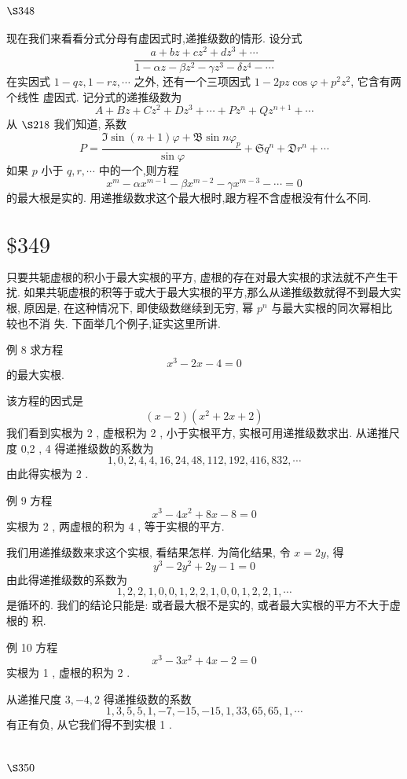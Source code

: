 \section{$\S 348$}

现在我们来看看分式分母有虚因式时,递推级数的情形. 设分式
\[
\frac{a+b z+c z^{2}+d z^{3}+\cdots}{1-\alpha z-\beta z^{2}-\gamma z^{3}-\delta z^{4}-\cdots}
\]
在实因式 $1-q z, 1-r z, \cdots$ 之外, 还有一个三项因式 $1-2 p z \cos \varphi+p^{2} z^{2}$, 它含有两个线性 虚因式. 记分式的递推级数为
\[
A+B z+C z^{2}+D z^{3}+\cdots+P z^{n}+Q z^{n+1}+\cdots
\]
从 $\S 218$ 我们知道, 系数
\[
P=\frac{\mathfrak{I} \sin (n+1) \varphi+\mathfrak{B} \sin n \varphi_{p}}{\sin \varphi}+\mathfrak{S} q^{n}+\mathfrak{D} r^{n}+\cdots
\]
如果 $p$ 小于 $q, r, \cdots$ 中的一个,则方程
\[
x^{m}-\alpha x^{m-1}-\beta x^{m-2}-\gamma x^{m-3}-\cdots=0
\]
的最大根是实的. 用递推级数求这个最大根时,跟方程不含虚根没有什么不同.

\section{$\$ 349$}

只要共轭虚根的积小于最大实根的平方, 虚根的存在对最大实根的求法就不产生干 扰. 如果共轭虚根的积等于或大于最大实根的平方,那么从递推级数就得不到最大实根, 原因是, 在这种情况下, 即使级数继续到无穷, 幂 $p^{n}$ 与最大实根的同次幂相比较也不消 失. 下面举几个例子,证实这里所讲.

例 8 求方程
\[
x^{3}-2 x-4=0
\]
的最大实根.

该方程的因式是
\[
(x-2)\left(x^{2}+2 x+2\right)
\]
我们看到实根为 2 , 虚根积为 2 , 小于实根平方, 实根可用递推级数求出. 从递推尺度 0,2 , 4 得递推级数的系数为
\[
1,0,2,4,4,16,24,48,112,192,416,832, \cdots
\]
由此得实根为 2 .

例 9 方程
\[
x^{3}-4 x^{2}+8 x-8=0
\]
实根为 2 , 两虚根的积为 4 , 等于实根的平方.

我们用递推级数来求这个实根, 看结果怎样. 为简化结果, 令 $x=2 y$, 得
\[
y^{3}-2 y^{2}+2 y-1=0
\]
由此得递推级数的系数为
\[
1,2,2,1,0,0,1,2,2,1,0,0,1,2,2,1, \cdots
\]
是循环的. 我们的结论只能是: 或者最大根不是实的, 或者最大实根的平方不大于虚根的 积.

例 10 方程
\[
x^{3}-3 x^{2}+4 x-2=0
\]
实根为 1 , 虚根的积为 2 .

从递推尺度 $3,-4,2$ 得递推级数的系数
\[
1,3,5,5,1,-7,-15,-15,1,33,65,65,1, \cdots
\]
有正有负, 从它我们得不到实根 1 .

\section{$\S 350$}

